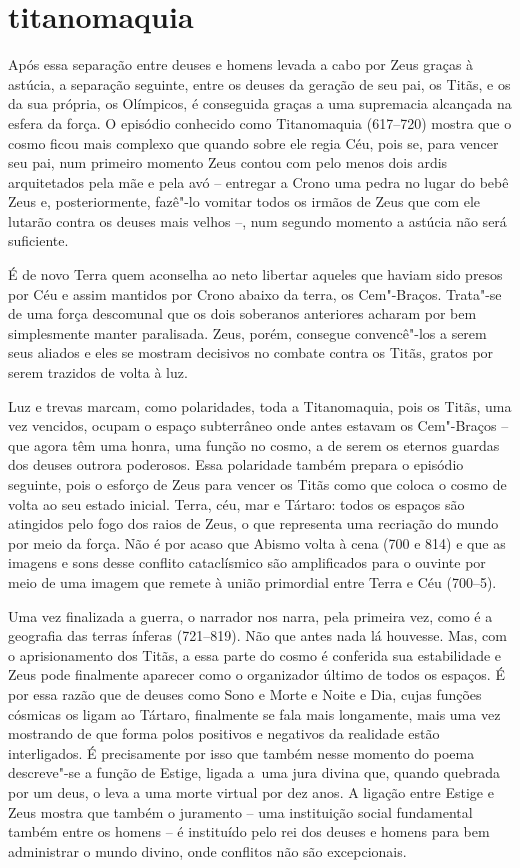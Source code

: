 \section{titanomaquia}

Após essa separação entre deuses e homens levada a cabo por Zeus graças à
astúcia, a separação seguinte, entre os deuses da geração de seu pai, os Titãs,
e os da sua própria, os Olímpicos, é conseguida graças a uma supremacia
alcançada na esfera da força. O episódio conhecido como Titanomaquia (617--720)
mostra que o cosmo ficou mais complexo que quando sobre ele regia Céu, pois se,
para vencer seu pai, num primeiro momento Zeus contou com pelo menos dois ardis
arquitetados pela mãe e pela avó – entregar a Crono uma pedra no lugar do bebê
Zeus e, posteriormente, fazê"-lo vomitar todos os irmãos de Zeus que com ele
lutarão contra os deuses mais velhos –, num segundo momento a astúcia não será
suficiente.

É de novo Terra quem aconselha ao neto libertar aqueles que haviam sido presos
por Céu e assim mantidos por Crono abaixo da terra, os Cem"-Braços. Trata"-se
de uma força descomunal que os dois soberanos anteriores acharam por bem
simplesmente manter paralisada. Zeus, porém, consegue convencê"-los a serem
seus aliados e eles se mostram decisivos no combate contra os Titãs, gratos por
serem trazidos de volta à luz.

Luz e trevas marcam, como polaridades, toda a Titanomaquia, pois os Titãs, uma vez
vencidos, ocupam o espaço subterrâneo onde antes estavam os Cem"-Braços -- que
agora têm uma honra, uma função no cosmo, a de serem os eternos guardas dos
deuses outrora poderosos. Essa polaridade também prepara o episódio seguinte,
pois o esforço de Zeus para vencer os Titãs como que coloca o cosmo de volta ao
seu estado inicial. Terra, céu, mar e Tártaro: todos os espaços são atingidos
pelo fogo dos raios de Zeus, o que representa uma recriação do mundo por meio
da força. Não é por acaso que Abismo volta à cena (700 e 814) e que as imagens
e sons desse conflito cataclísmico são amplificados para o ouvinte por meio de
uma imagem que remete à união primordial entre Terra e Céu (700--5).

Uma vez finalizada a guerra, o narrador nos narra, pela primeira vez, como é a
geografia das terras ínferas (721--819). Não que antes nada lá houvesse. Mas,
com o aprisionamento dos Titãs, a essa parte do cosmo é conferida sua
estabilidade e Zeus pode finalmente aparecer como o organizador último de todos
os espaços. É por essa razão que de deuses como Sono e Morte e Noite e Dia,
cujas funções cósmicas os ligam ao Tártaro, finalmente se fala mais longamente,
mais uma vez mostrando de que forma polos positivos e negativos da realidade
estão interligados. É precisamente por isso que também nesse momento do poema
descreve"-se a função de Estige, ligada \mbox{a uma} jura divina que, quando quebrada
por um deus, o leva a uma morte virtual por dez anos. A ligação entre Estige e
Zeus mostra que também o juramento – uma instituição social fundamental também
entre os homens – é instituído pelo rei dos deuses e homens para bem
administrar o mundo divino, onde conflitos não são excepcionais.

